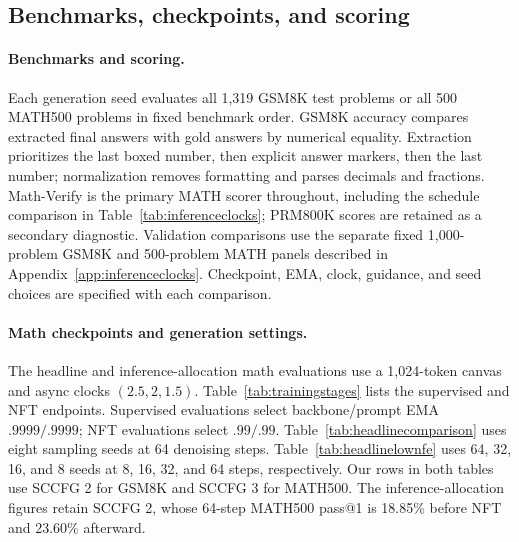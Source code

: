 \documentclass{article}
\begin{document}
\subsection{Benchmarks, checkpoints, and scoring}

\paragraph{Benchmarks and scoring.}
Each generation seed evaluates all 1,319 GSM8K test problems or all 500 MATH500 problems in fixed benchmark order. GSM8K accuracy compares extracted final answers with gold answers by numerical equality. Extraction prioritizes the last boxed number, then explicit answer markers, then the last number; normalization removes formatting and parses decimals and fractions. Math-Verify is the primary MATH scorer throughout, including the schedule comparison in Table~\ref{tab:inferenceclocks}; PRM800K scores are retained as a secondary diagnostic. Validation comparisons use the separate fixed 1,000-problem GSM8K and 500-problem MATH panels described in Appendix~\ref{app:inferenceclocks}. Checkpoint, EMA, clock, guidance, and seed choices are specified with each comparison.

\paragraph{Math checkpoints and generation settings.}
The headline and inference-allocation math evaluations use a 1,024-token canvas and async clocks $(2.5,2,1.5)$. Table~\ref{tab:trainingstages} lists the supervised and NFT endpoints. Supervised evaluations select backbone/prompt EMA $.9999/.9999$; NFT evaluations select $.99/.99$. Table~\ref{tab:headlinecomparison} uses eight sampling seeds at 64 denoising steps. Table~\ref{tab:headlinelownfe} uses 64, 32, 16, and 8 seeds at 8, 16, 32, and 64 steps, respectively. Our rows in both tables use SCCFG 2 for GSM8K and SCCFG 3 for MATH500. The inference-allocation figures retain SCCFG 2, whose 64-step MATH500 pass@1 is 18.85\% before NFT and 23.60\% afterward.
\end{document}
